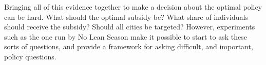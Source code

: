 \documentclass[12pt,english]{article}
\begin{document}
Bringing all of this evidence together to make a decision about the optimal policy can be hard. What should the optimal subsidy be? What share of individuals should receive the subsidy? Should all cities be targeted? However, experiments such as the one run by No Lean Season make it possible to start to ask these sorts of questions, and provide a framework for asking difficult, and important, policy questions.
\end{document}
